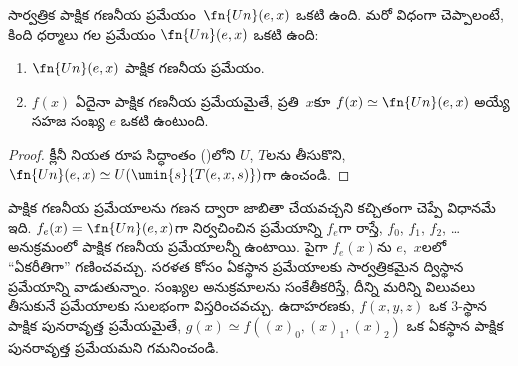 \documentclass[../../../include/open-logic-section]{subfiles}
\begin{document}

\begin{thm}
సార్వత్రిక పాక్షిక గణనీయ ప్రమేయం~$\fn{Un}(e,x)$ ఒకటి ఉంది. మరో
విధంగా చెప్పాలంటే, కింది ధర్మాలు గల ప్రమేయం $\fn{Un}(e,x)$ ఒకటి ఉంది:
\begin{enumerate}
\item $\fn{Un}(e,x)$ పాక్షిక గణనీయ ప్రమేయం.
\item $f(x)$ ఏదైనా పాక్షిక గణనీయ ప్రమేయమైతే, ప్రతి~$x$కూ
$f(x) \simeq \fn{Un}(e,x)$ అయ్యే సహజ సంఖ్య $e$ ఒకటి ఉంటుంది.
\end{enumerate}
\end{thm}

\begin{proof}
క్లీనీ నియత రూప సిద్ధాంతం ()లోని $U$,
$T$లను తీసుకొని, $\fn{Un}(e,x) \simeq
U(\umin{s}{T(e,x,s)})$గా ఉంచండి.
\end{proof}

\begin{explain}
పాక్షిక గణనీయ ప్రమేయాలను గణన ద్వారా జాబితా చేయవచ్చని
కచ్చితంగా చెప్పే విధానమే ఇది. $f_e(x)=\fn{Un}(e,x)$గా నిర్వచించిన ప్రమేయాన్ని
$f_e$గా రాస్తే, $f_0$, $f_1$, $f_2$, \dots{} అనుక్రమంలో పాక్షిక
గణనీయ ప్రమేయాలన్నీ ఉంటాయి. పైగా $f_e(x)$ను $e$,~$x$లలో
``ఏకరీతిగా'' గణించవచ్చు. సరళత కోసం ఏకస్థాన ప్రమేయాలకు సార్వత్రికమైన
ద్విస్థాన ప్రమేయాన్ని వాడుతున్నాం. సంఖ్యల అనుక్రమాలను సంకేతీకరిస్తే,
దీన్ని మరిన్ని విలువలు తీసుకునే ప్రమేయాలకు సులభంగా విస్తరించవచ్చు. ఉదాహరణకు,
$f(x,y,z)$ ఒక $3$-స్థాన పాక్షిక పునరావృత్త ప్రమేయమైతే,
$g(x) \simeq f((x)_0,(x)_1,(x)_2)$ ఒక ఏకస్థాన పాక్షిక పునరావృత్త
ప్రమేయమని గమనించండి.
\end{explain}
\end{document}
